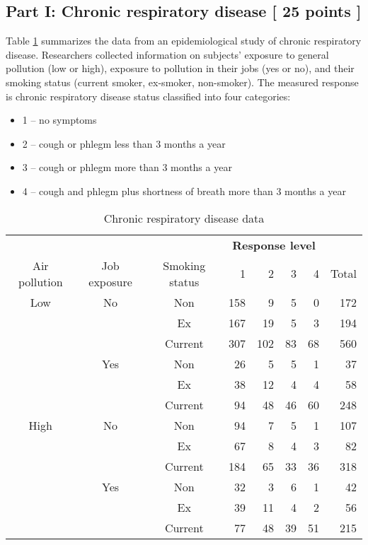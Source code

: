 \documentclass[11pt]{article}
\begin{document}
\newpage
\setcounter{page}{1}

\subsection*{Part I:  Chronic respiratory disease [ 25 points ] }

Table \ref{table:ex1} summarizes the data from an epidemiological study of chronic respiratory disease. Researchers collected information on subjects' exposure to general pollution (low or high), exposure to pollution in their jobs (yes or no), and their smoking status (current smoker, ex-smoker, non-smoker). The measured response is chronic respiratory disease status classified into four categories:
\begin{itemize}
\item 1 -- no symptoms \\ \vspace{-8mm}
\item 2 -- cough or phlegm less than 3 months a year \\ \vspace{-8mm}
\item 3 -- cough or phlegm more than 3 months a year \\ \vspace{-8mm}
\item 4 -- cough and phlegm plus shortness of breath more than 3 months a year \\
\end{itemize}

\begin{table}[h]
\begin{center}
\begin{tabular}{cccrrrrr} \hline
 &  &  &  \multicolumn{4}{c}{\bf Response level}  & \\ \cline{4-7}
 Air pollution & Job exposure & Smoking status & 1 & 2 & 3 & 4 & Total \\ \hline
Low & No & Non & 158 & 9 & 5 & 0 & 172\\
  &  &  Ex & 167 & 19 & 5 & 3 & 194 \\ 
  &  &  Current & 307 & 102 & 83 & 68 & 560 \\ \cline{3-8}
  &  Yes & Non & 26 & 5 & 5 & 1 & 37 \\
   &  & Ex & 38 & 12 & 4 & 4 & 58 \\
   &  &  Current &  94 & 48 & 46  & 60 & 248 \\ \hline
High & No & Non & 94 & 7 & 5 & 1 & 107 \\
  &  &  Ex & 67 & 8 & 4 & 3 & 82 \\ 
  & & Current &  184 & 65  & 33 & 36 & 318 \\ \cline{3-8}
  & Yes & Non & 32 & 3 & 6 & 1 & 42 \\
   &  & Ex & 39 & 11 & 4 & 2 & 56 \\ 
   &  &  Current & 77 & 48 & 39 & 51 & 215 \\ \hline
  \end{tabular}
  \caption{Chronic respiratory disease data} \label{table:ex1}
  \end{center}
  \end{table}
    
\end{document}
